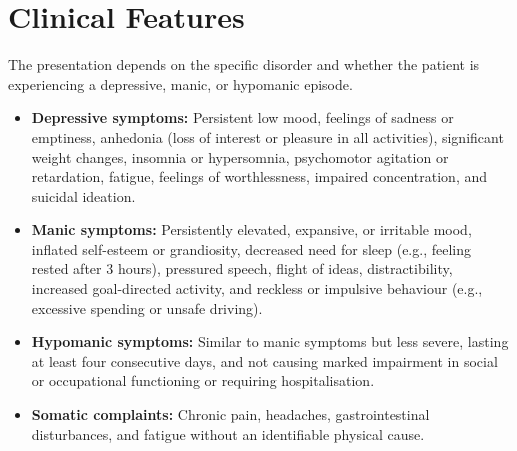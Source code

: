 \section*{Clinical Features}
The presentation depends on the specific disorder and whether the patient is experiencing a depressive, manic, or hypomanic episode.
\begin{itemize}
    \item \textbf{Depressive symptoms:} Persistent low mood, feelings of sadness or emptiness, anhedonia (loss of interest or pleasure in all activities), significant weight changes, insomnia or hypersomnia, psychomotor agitation or retardation, fatigue, feelings of worthlessness, impaired concentration, and suicidal ideation.
    \item \textbf{Manic symptoms:} Persistently elevated, expansive, or irritable mood, inflated self-esteem or grandiosity, decreased need for sleep (e.g., feeling rested after 3 hours), pressured speech, flight of ideas, distractibility, increased goal-directed activity, and reckless or impulsive behaviour (e.g., excessive spending or unsafe driving).
    \item \textbf{Hypomanic symptoms:} Similar to manic symptoms but less severe, lasting at least four consecutive days, and not causing marked impairment in social or occupational functioning or requiring hospitalisation.
    \item \textbf{Somatic complaints:} Chronic pain, headaches, gastrointestinal disturbances, and fatigue without an identifiable physical cause.
\end{itemize}

